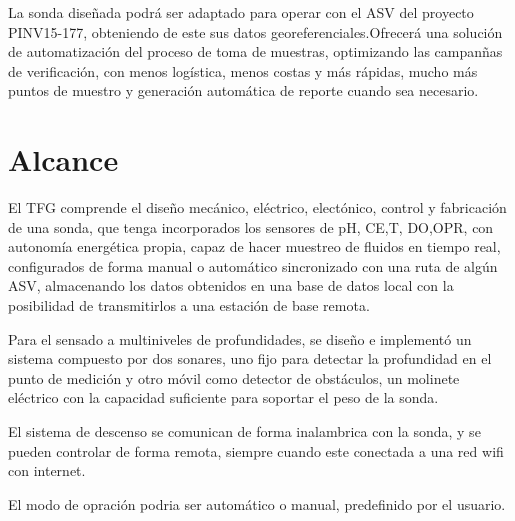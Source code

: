 La sonda diseñada podr\'a ser adaptado para operar con el ASV del proyecto PINV15-177, obteniendo de este sus datos georeferenciales.Ofrecerá una soluci\'on de automatizaci\'on del proceso de toma de muestras, optimizando  las campan\~nas de verificaci\'on, con menos log\'istica, menos costas y m\'as r\'apidas,  mucho m\'as puntos de muestro y generación automática de reporte cuando sea necesario.


\section{Alcance}
El TFG comprende el dise\~no mec\'anico, el\'ectrico, elect\'onico, control y fabricaci\'on de una sonda, que tenga incorporados los sensores de pH, CE,T, DO,OPR, con autonom\'ia energ\'etica propia, capaz de hacer muestreo de fluidos en tiempo real, configurados de forma manual o autom\'atico sincronizado con una ruta de alg\'un ASV, almacenando los datos obtenidos en una base de datos local con la posibilidad de transmitirlos a una estaci\'on de base remota. 

Para el sensado a multiniveles de profundidades, se dise\~no e implement\'o un sistema compuesto por dos sonares, uno fijo para detectar la profundidad en el punto de medici\'on y otro m\'ovil como detector de obst\'aculos, un molinete el\'ectrico con la capacidad suficiente para soportar el peso de la sonda.

El sistema de descenso se comunican de forma inalambrica con la sonda, y se pueden controlar de forma remota, siempre cuando este conectada a una red wifi con internet.

El modo de opraci\'on podria ser autom\'atico o manual, predefinido por el usuario.





